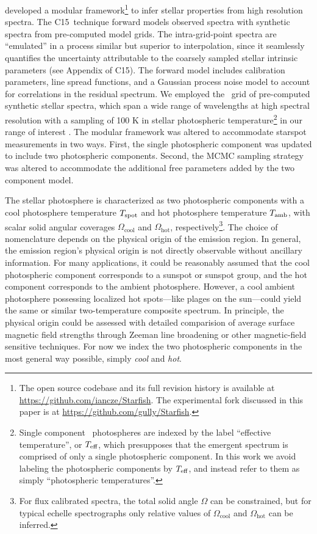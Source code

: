 \documentclass[twocolumn]{emulateapj}%
\newcommand{\iancze}{{\sc C15}}
\begin{document}
\citet[hereafter \iancze]{czekala15} developed a modular framework\footnote{The open source codebase and its full revision history is available at \url{https://github.com/iancze/Starfish}.  The experimental fork discussed in this paper is at \url{https://github.com/gully/Starfish}.  } to infer stellar properties from high resolution spectra.  The \iancze\ technique forward models observed spectra with synthetic spectra from pre-computed model grids.  The intra-grid-point spectra are ``emulated'' in a process similar but superior to interpolation, since it seamlessly quantifies the uncertainty attributable to the coarsely sampled stellar intrinsic parameters (see Appendix of \iancze).  The forward model includes calibration parameters, line spread functions, and a Gaussian process noise model to account for correlations in the residual spectrum.  We employed the \PHOENIX\ grid of pre-computed synthetic stellar spectra, which span a wide range of wavelengths at high spectral resolution with a sampling of 100 K in stellar photospheric temperature\footnote{Single component \PHOENIX\ photospheres are indexed by the label ``effective temperature'', or $T_\textrm{eff}$, which presupposes that the emergent spectrum is comprised of only a single photospheric component.  In this work we avoid labeling the photospheric components by $T_\textrm{eff}$, and instead refer to them as simply ``photospheric temperatures''.} in our range of interest \citep{husser13}.  The modular framework was altered to accommodate starspot measurements in two ways. First, the single photospheric component was updated to include two photospheric components.  Second, the MCMC sampling strategy was altered to accommodate the additional free parameters added by the two component model.  

The stellar photosphere is characterized as two photospheric components with a cool photosphere temperature $T_\textrm{spot}$ and hot photosphere temperature $T_\textrm{amb}$, with scalar solid angular coverages $\Omega_{\mathrm{cool}}$ and $\Omega_{\mathrm{hot}}$, respectively\footnote{For flux calibrated spectra, the total solid angle $\Omega$ can be constrained, but for typical echelle spectrographs only relative values of $\Omega_{\mathrm{cool}}$ and $\Omega_{\mathrm{hot}}$ can be inferred.}.  
The choice of nomenclature depends on the physical origin of the emission region.  In general, the emission region's physical origin is not directly observable without ancillary information.  For many applications, it could be reasonably assumed that the cool photospheric component corresponds to a sunspot or sunspot group, and the hot component corresponds to the ambient photosphere.  However, a cool ambient photosphere possessing localized hot spots---like plages on the sun---could yield the same or similar two-temperature composite spectrum.  In principle, the physical origin could be assessed with detailed comparision of average surface magnetic field strengths through Zeeman line broadening or other magnetic-field sensitive techniques.  For now we index the two photospheric components in the most general way possible, simply \emph{cool} and \emph{hot}. 
\end{document}
